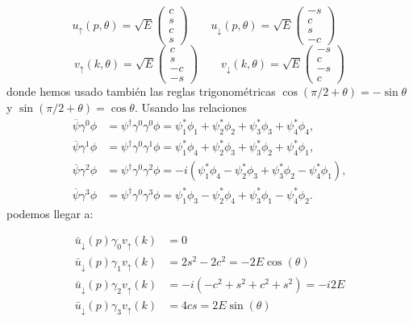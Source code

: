 \begin{equation} 
	u_\uparrow(p,\theta)= \sqrt{E} \begin{pmatrix}
		c \\ s \\ c \\ s
	\end{pmatrix} \qquad 
	u_\downarrow(p,\theta)= \sqrt{E} \begin{pmatrix}
		-s \\ c \\ s \\ -c
	\end{pmatrix}\quad
\end{equation}
\begin{equation}
	v_\uparrow(k,\theta) = \sqrt{E} \begin{pmatrix}
		c \\ s \\ -c \\ -s
	\end{pmatrix} \qquad 
	v_\downarrow(k,\theta) = \sqrt{E} \begin{pmatrix}
		-s \\ c \\ -s \\ c
	\end{pmatrix} 
\end{equation}
donde hemos usado también las reglas trigonométricas $\cos (\pi/2 +\theta) = - \sin \theta$ y $\sin (\pi/2+\theta) = \cos \theta$. Usando las relaciones \cite{SaboridoSilva2025ParticlePhysicsI,thomson_modern_physics}
\begin{align}
	\overline{\psi}\gamma^0\phi & = \psi^\dagger \gamma^0 \gamma^0 \phi
	= \psi_1^*\phi_1 + \psi_2^*\phi_2 + \psi_3^*\phi_3 + \psi_4^*\phi_4,     \\
	\overline{\psi}\gamma^1\phi & = \psi^\dagger \gamma^0 \gamma^1 \phi
	= \psi_1^*\phi_4 + \psi_2^*\phi_3 + \psi_3^*\phi_2 + \psi_4^*\phi_1,     \\
	\overline{\psi}\gamma^2\phi & = \psi^\dagger \gamma^0 \gamma^2 \phi
	= -i(\psi_1^*\phi_4 - \psi_2^*\phi_3 + \psi_3^*\phi_2 - \psi_4^*\phi_1), \\
	\overline{\psi}\gamma^3\phi & = \psi^\dagger \gamma^0 \gamma^3 \phi
	= \psi_1^*\phi_3 - \psi_2^*\phi_4 + \psi_3^*\phi_1 - \psi_4^*\phi_2.
\end{align}
podemos llegar a: 

\begin{align*}
    \bar{u}_\downarrow (p) \gamma_0 {v}_\uparrow (k) & = 0 \\
    \bar{u}_\downarrow (p) \gamma_1 {v}_\uparrow (k) & = 2s^2-2c^2 = - 2E\cos (\theta)  \\
    \bar{u}_\downarrow (p) \gamma_2 {v}_\uparrow (k) & = -i(-c^2 + s^2 + c^2 + s^2 ) = - i2E \\
    \bar{u}_\downarrow (p) \gamma_3 {v}_\uparrow (k) & = 4 c s = 2E \sin (\theta)  
\end{align*}

